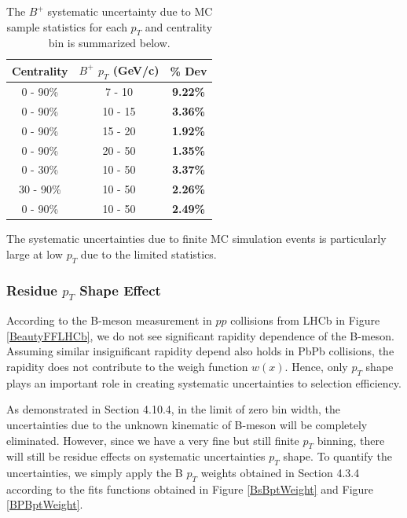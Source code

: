 \begin{table}[h]
\begin{center}
\caption{The $B^+$ systematic uncertainty due to MC sample statistics for each $p_T$ and centrality bin is summarized below.}
\vspace{1em}
\label{BPMCStatSyst}
  \begin{tabular}{| c | c |c |}
    \hline
     Centrality & $B^+$ $p_T$ (GeV/c) & \% Dev \\
    \hline
    \hline
0 - 90\% & 7 - 10 &   \textbf{9.22\% }     \\ 
0 - 90\% & 10 - 15 & \textbf{3.36\% }    \\ 
0 - 90\% & 15 - 20 &  \textbf{1.92\% }     \\ 
0 - 90\% & 20 - 50 &  \textbf{1.35\% }    \\ 
0 - 30\% & 10 - 50 &   \textbf{3.37\% }  \\ 
30 - 90\% & 10 - 50 & \textbf{2.26\% }    \\ 
0 - 90\% & 10 - 50 &  \textbf{2.49\% }   \\ 
    \hline
    \hline
\end{tabular}
\end{center}
\end{table}

The systematic uncertainties due to finite MC simulation events is particularly large at low $p_T$ due to the limited statistics. 
 

\subsubsection{Residue $p_T$ Shape Effect}

According to the B-meson measurement in $pp$ collisions from LHCb in Figure \ref{BeautyFFLHCb}, we do not see significant rapidity dependence of the B-meson. Assuming similar insignificant rapidity depend also holds in PbPb collisions, the rapidity does not contribute to the weigh function $w(x)$. Hence, only $p_T$ shape plays an important role in creating systematic uncertainties to selection efficiency. 

As demonstrated in Section 4.10.4, in the limit of zero bin width, the uncertainties due to the unknown kinematic of B-meson will be completely eliminated. However, since we have a very fine but still finite $p_T$ binning, there will still be residue effects on systematic uncertainties $p_T$ shape. To quantify the uncertainties, we simply apply the B $p_T$ weights obtained in Section 4.3.4 according to the fits functions obtained in Figure \ref{BsBptWeight} and Figure \ref{BPBptWeight}. 


